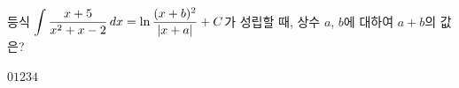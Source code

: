 등식 $\displaystyle\int\dfrac{x+5}{x^2+x-2}\mkern3mu dx=\ln\dfrac{(x+b)^2}{|x+a|}+C$가 성립할 때, 상수 $a$, $b$에 대하여 $a+b$의 값은? 
\begin{choices32}{$0$}{$1$}{$2$}{$3$}{$4$}\end{choices32}
